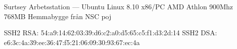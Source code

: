 \documentclass[a5paper]{article}
\begin{document}
   \computerdescription
       {Surtsey}
       {Arbetsstation}
       {---}
       {Ubuntu Linux 8.10}
       {x86/PC}
       {AMD Athlon 900Mhz}
       {768MB}
       {Hemmabygge från NSC}
       {poj}



   \sshfingerprintheading
   \begin{sshfingerprint}
SSH2 RSA: 54:a9:14:62:03:39:d6:c2:a0:d5:65:c5:f1:d3:2d:14
SSH2 DSA: e6:3c:4a:39:ee:36:47:f5:21:06:09:30:93:67:ec:4a
   \end{sshfingerprint}
\end{document}
